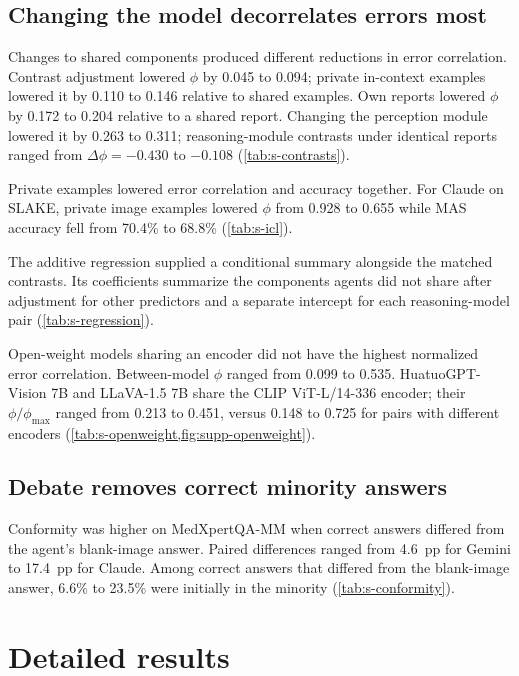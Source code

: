 \subsection{Changing the model decorrelates errors most}

Changes to shared components produced different reductions in error correlation.
Contrast adjustment lowered $\phi$ by 0.045 to 0.094; private in-context examples lowered it by 0.110 to 0.146 relative to shared examples.
Own reports lowered $\phi$ by 0.172 to 0.204 relative to a shared report.
Changing the perception module lowered it by 0.263 to 0.311; reasoning-module contrasts under identical reports ranged from $\Delta\phi=-0.430$ to $-0.108$ (\cref{tab:s-contrasts}).

Private examples lowered error correlation and accuracy together.
For Claude on SLAKE, private image examples lowered $\phi$ from 0.928 to 0.655 while MAS accuracy fell from 70.4\% to 68.8\% (\cref{tab:s-icl}).

The additive regression supplied a conditional summary alongside the matched contrasts.
Its coefficients summarize the components agents did not share after adjustment for other predictors and a separate intercept for each reasoning-model pair (\cref{tab:s-regression}).

Open-weight models sharing an encoder did not have the highest normalized error correlation.
Between-model $\phi$ ranged from 0.099 to 0.535.
HuatuoGPT-Vision 7B and LLaVA-1.5 7B share the CLIP ViT-L/14-336 encoder; their $\phi/\phi_{\max}$ ranged from 0.213 to 0.451, versus 0.148 to 0.725 for pairs with different encoders (\cref{tab:s-openweight,fig:supp-openweight}).

\subsection{Debate removes correct minority answers}

Conformity was higher on MedXpertQA-MM when correct answers differed from the agent's blank-image answer.
Paired differences ranged from 4.6~pp for Gemini to 17.4~pp for Claude.
Among correct answers that differed from the blank-image answer, 6.6\% to 23.5\% were initially in the minority (\cref{tab:s-conformity}).

\section{Detailed results}\label{sec:supp-tables}

